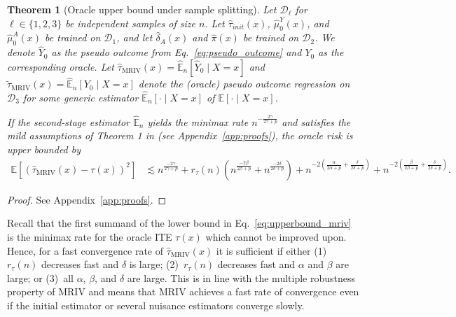 \documentclass[nonatbib]{article}
\newcommand{\E}{\mathbb{E}}
\newcommand{\frameworkname}{MRIV\xspace}
\theoremstyle{definition}
\theoremstyle{plain}
\newtheorem{theorem}{Theorem}
\begin{document}
\begin{theorem}[Oracle upper bound under sample splitting]\label{thrm:upperbound}
Let $\mathcal{D}_\ell$ for $\ell \in \{1,2,3\}$ be independent samples of size $n$. Let $\hat{\tau}_{init}(x)$, $\hat{\mu}_0^Y(x)$, and $\hat{\mu}_0^A(x)$ be trained on $\mathcal{D}_1$, and let $\hat{\delta}_A(x)$ and $\hat{\pi}(x)$ be trained on $\mathcal{D}_2$. We denote $\hat{Y}_0$ as the pseudo outcome from Eq.~\eqref{eq:pseudo_outcome} and $Y_0$ as the corresponding oracle. Let $\hat{\tau}_{\mathrm{MRIV}}(x) = \hat{\E}_n[\hat{Y}_0 \mid X = x]$ and $\widetilde{\tau}_{\mathrm{MRIV}}(x) = \hat{\E}_n[Y_0 \mid X = x]$ denote the (oracle) pseudo outcome regression on $\mathcal{D}_3$ for some generic estimator $\hat{\E}_n[ \cdot \mid X =x]$ of $\E[ \cdot \mid X =x]$.

If the second-stage estimator $\hat{\E}_n$ yields the minimax rate $n^{-\frac{2\gamma}{2\gamma + p}}$ and satisfies the mild assumptions of Theorem 1 in \cite{Kennedy.2020} (see Appendix~\ref*{app:proofs}), the oracle risk is upper bounded by
\begin{equation}\label{eq:upperbound_mriv}
\begin{split}
    \E\left[\left(\hat{\tau}_{\mathrm{MRIV}}(x) - \tau(x)\right)^2\right] & \lesssim   n^{\frac{-2\gamma}{2\gamma+p}} + r_{\tau}(n) \left(n^{\frac{-2\beta}{2\beta+p}} + n^{\frac{-2\delta}{2\delta+p}}  \right) + 
    n^{-2\left(\frac{\alpha}{2\alpha+p}+\frac{\delta}{2\delta+p}\right)} +
    n^{-2\left(\frac{\beta}{2\beta+p}+\frac{\delta}{2\delta+p}\right)} .
\end{split}
\end{equation}
\end{theorem}
\begin{proof}
See Appendix~\ref*{app:proofs}.
\end{proof}


Recall that the first summand of the lower bound in Eq.~\eqref{eq:upperbound_mriv} is the minimax rate for the oracle ITE $\tau(x)$ which cannot be improved upon. Hence, for a fast convergence rate of $\hat{\tau}_{\mathrm{MRIV}}(x)$ it is sufficient if either (1)~$r_{\tau}(n)$ decreases fast and $\delta$ is large; (2)~$r_{\tau}(n)$ decreases fast and $\alpha$ and $\beta$ are large; or (3)~all $\alpha$, $\beta$, and $\delta$ are large. This is in line with the multiple robustness property of \frameworkname and means that \frameworkname achieves a fast rate of convergence even if the initial estimator or several nuisance estimators converge slowly.
\end{document}
